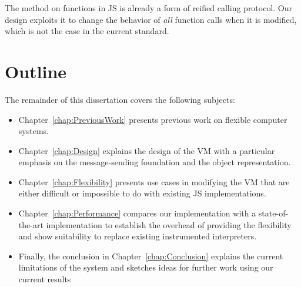 The  method on functions in JS is already a form of reified calling
protocol. Our design exploits it to change the behavior of \textit{all} function
calls when it is modified, which is not the case in the current standard.

%
%
%

\section{Outline}

The remainder of this dissertation covers the following subjects: 
\begin{itemize}
    \item Chapter~\ref{chap:PreviousWork} presents previous work on flexible computer systems.
    \item Chapter~\ref{chap:Design} explains the design of the VM with a
        particular emphasis on the message-sending foundation and the object
        representation.
    \item Chapter~\ref{chap:Flexibility} presents use cases in modifying the VM
        that are either difficult or impossible to do with existing JS
        implementations.
    \item Chapter~\ref{chap:Performance} compares our implementation with a
        state-of-the-art implementation to establish the overhead of providing
        the flexibility and show suitability to replace existing instrumented
        interpreters.
    \item Finally, the conclusion in Chapter~\ref{chap:Conclusion} explains the
        current limitations of the system and sketches ideas for further work
        using our current results
\end{itemize}
